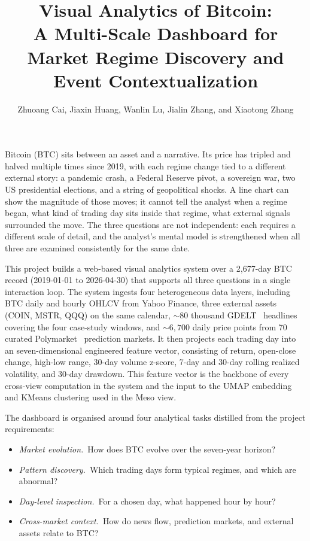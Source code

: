 \documentclass[journal,hideappendix]{vgtc}      %
\title{Visual Analytics of Bitcoin:\\A Multi-Scale Dashboard for Market Regime Discovery and Event Contextualization}
\author{%
  Zhuoang Cai,
  Jiaxin Huang,
  Wanlin Lu,
  Jialin Zhang, and
  Xiaotong Zhang
}
\begin{document}

\maketitle

Bitcoin (BTC) sits between an asset and a narrative.  Its price has
tripled and halved multiple times since 2019, with each regime change
tied to a different external story: a pandemic crash, a Federal
Reserve pivot, a sovereign war, two US presidential elections, and a
string of geopolitical shocks.  A line chart can show the magnitude
of those moves; it cannot tell the analyst when a regime
began, what kind of trading day sits inside that regime, what external signals surrounded the move.
The three questions are not independent: each requires a different
scale of detail, and the analyst’s mental model is strengthened when all three are examined consistently for the same date.

This project builds a web-based visual analytics system over a
2{,}677-day BTC record (2019-01-01 to 2026-04-30) that supports all
three questions in a single interaction loop.  The system ingests four heterogeneous data layers, including BTC daily and hourly OHLCV from Yahoo Finance, three external assets (COIN, MSTR, QQQ) on the same calendar, $\sim 80$  thousand GDELT~\cite{gdelt} headlines covering the four case-study windows, and $\sim 6{,}700$ daily price points from 70 curated Polymarket~\cite{polymarket} prediction markets. It then projects each trading day into an seven-dimensional engineered feature vector, consisting of return, open-close change, high-low range, 30-day volume z-score, 7-day and 30-day rolling realized volatility, and 30-day drawdown. This feature vector is the backbone of every cross-view computation in the system and the input to the UMAP embedding and KMeans clustering used in the Meso view.

The dashboard is organised around four analytical tasks distilled
from the project requirements:

\begin{itemize}
  \item[\textbf{T1}] \emph{Market evolution.}~How does BTC evolve over
    the seven-year horizon?
  \item[\textbf{T2}] \emph{Pattern discovery.}~Which trading days form
    typical regimes, and which are abnormal?
  \item[\textbf{T3}] \emph{Day-level inspection.}~For a chosen day,
    what happened hour by hour?
  \item[\textbf{T4}] \emph{Cross-market context.}~How do news flow,
    prediction markets, and external assets relate to BTC?
\end{itemize}
\end{document}
